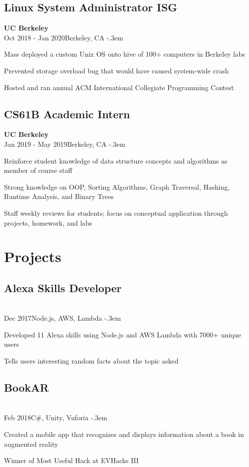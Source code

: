\documentclass{article}
\let\olditemize=\itemize \let\endolditemize=\enditemize
\renewenvironment{itemize}{\olditemize[topsep=0em] \itemsep-.3em}{\endolditemize}
\newcommand{\entry}[3]{\quad\textbf{#1}\\#2\qquad#3}
\begin{document}
\subsection{Linux System Administrator ISG}
\entry{UC Berkeley}{Oct 2018 - Jan 2020}{Berkeley, CA}
\begin{itemize}
  \item Mass deployed a custom Unix OS onto hive of 100+ computers in Berkeley labs
  \item Prevented storage overload bug that would have caused system-wide crash
  \item Hosted and ran annual ACM International Collegiate Programming Contest
\end{itemize}

\subsection{CS61B Academic Intern}
\entry{UC Berkeley}{Jan 2019 - May 2019}{Berkeley, CA}
\begin{itemize}
  \item Reinforce student knowledge of data structure concepts and
    algorithms as member of course staff
  \item Strong knowledge on OOP, Sorting Algorithms, Graph Traversal,
    Hashing, Runtime Analysis, and Binary Trees
  \item Staff weekly reviews for students; focus on conceptual
    application through projects, homework, and labs
\end{itemize}


\section{Projects}
\subsection{Alexa Skills Developer}
\entry{}{Dec 2017}{Node.js, AWS, Lambda}
\begin{itemize}
  \item Developed 11 Alexa skills using Node.js and AWS Lambda with 7000+ unique users
  \item Tells users interesting random facts about the topic asked
\end{itemize}

\subsection{BookAR}
\entry{}{Feb 2018}{C\#, Unity, Vuforia}
\begin{itemize}
  \item Created a mobile app that recognizes and displays information
    about a book in augmented reality
  \item Winner of Most Useful Hack at EVHacks III
\end{itemize}
\end{document}
